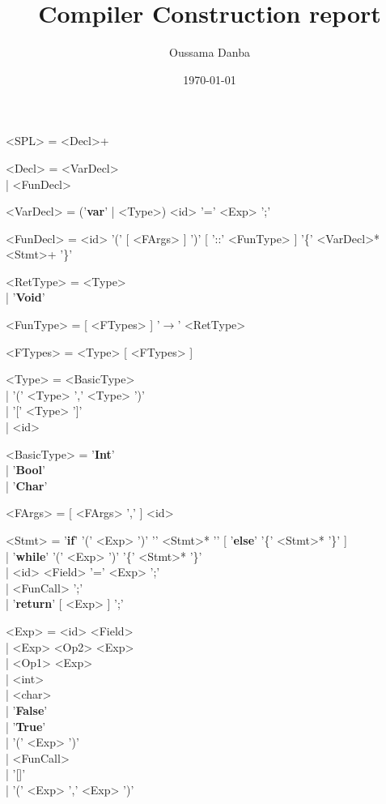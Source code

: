 \documentclass{article}
\title{Compiler Construction report}
\author{Oussama Danba}
\date{\today}
\begin{document}
\maketitle

\renewcommand{\syntleft}{$\langle$\normalfont\ttfamily}
\setlength{\grammarindent}{2cm}
\setlength{\grammarparsep}{0cm}
\begin{grammar}
<SPL> = <Decl>+

<Decl> = <VarDecl> \\| <FunDecl>

<VarDecl> = ('\textbf{var}' | <Type>) <id> '=' <Exp> ';'

<FunDecl> = <id> '(' [ <FArgs> ] ')' [ '::' <FunType> ] '\{' <VarDecl>* <Stmt>+ '\}'

<RetType> = <Type> \\| '\textbf{Void}'

<FunType> = [ <FTypes> ] '$\rightarrow$' <RetType>

<FTypes> = <Type> [ <FTypes> ]

<Type> = <BasicType> \\| '(' <Type> ',' <Type> ')' \\| '[' <Type> ']' \\| <id>

<BasicType> = '\textbf{Int}' \\| '\textbf{Bool}' \\| '\textbf{Char}'

<FArgs> = [ <FArgs> ',' ] <id>

<Stmt> = '\textbf{if}' '(' <Exp> ')' '{' <Stmt>* '}' [ '\textbf{else}' '\{' <Stmt>* '\}' ] \\| '\textbf{while}' '(' <Exp> ')' '\{' <Stmt>* '\}' \\| <id> <Field> '=' <Exp> ';' \\| <FunCall> ';' \\| '\textbf{return}' [ <Exp> ] ';'

<Exp> = <id> <Field> \\| <Exp> <Op2> <Exp> \\| <Op1> <Exp> \\| <int> \\| <char> \\| '\textbf{False}' \\| '\textbf{True}' \\| '(' <Exp> ')' \\| <FunCall> \\| '[]' \\| '(' <Exp> ',' <Exp> ')'


\end{grammar}
\end{document}

